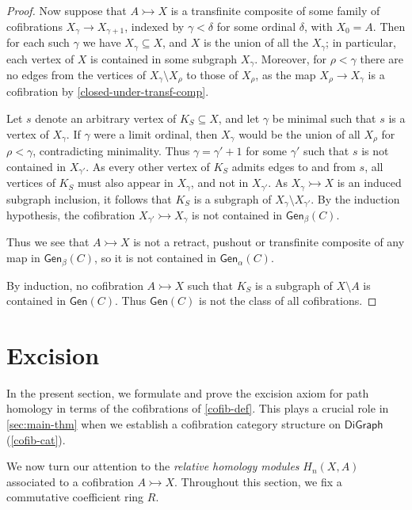 \documentclass[11pt]{article}
\theoremstyle{definition}
\numberwithin{equation}{section}
\newcommand{\DiGraph}{\mathsf{DiGraph}}
\newcommand{\Gen}{\mathsf{Gen}}
\newcommand{\cto}{\rightarrowtail}
\begin{document}
\begin{proof}
Now suppose that $A \cto X$ is a transfinite composite of some family of cofibrations $X_\gamma \to X_{\gamma + 1}$, indexed by $\gamma < \delta$ for some ordinal $\delta$, with $X_0 = A$. Then for each such $\gamma$ we have $X_\gamma \subseteq X$, and $X$ is the union of all the $X_\gamma$; in particular, each vertex of $X$ is contained in some subgraph $X_\gamma$. Moreover, for $\rho < \gamma$ there are no edges from the vertices of $X_\gamma \setminus X_\rho$ to those of $X_\rho$, as the map $X_\rho \to X_\gamma$ is a cofibration by \cref{closed-under-transf-comp}. 

Let $s$ denote an arbitrary vertex of $K_S \subseteq X$, and let $\gamma$ be minimal such that $s$ is a vertex of $X_\gamma$. If $\gamma$ were a limit ordinal, then $X_\gamma$ would be the union of all $X_\rho$ for $\rho < \gamma$, contradicting minimality. Thus $\gamma = \gamma' + 1$ for some $\gamma'$ such that $s$ is not contained in $X_{\gamma'}$. As every other vertex of $K_S$ admits edges to and from $s$, all vertices of $K_S$ must also appear in $X_\gamma$, and not in $X_{\gamma'}$. As $X_{\gamma} \cto X$ is an induced subgraph inclusion, it follows that $K_S$ is a subgraph of $X_\gamma \setminus X_{\gamma'}$. By the induction hypothesis, the cofibration $X_{\gamma'} \cto X_\gamma$ is not contained in $\Gen_{\beta}(C)$.

Thus we see that $A \cto X$ is not a retract, pushout or transfinite composite of any map in $\Gen_{\beta}(C)$, so it is not contained in $\Gen_{\alpha}(C)$.

By induction, no cofibration $A \cto X$ such that $K_S$ is a subgraph of $X \setminus A$ is contained in $\Gen(C)$. Thus $\Gen(C)$ is not the class of all cofibrations.
\end{proof}

\section{Excision} \label{sec:excision}

In the present section, we formulate and prove the excision axiom for path homology in terms of the cofibrations of \cref{cofib-def}.
This plays a crucial role in \cref{sec:main-thm} when we establish a cofibration category structure on $\DiGraph$ (\cref{cofib-cat}).

We now turn our attention to the \emph{relative homology modules} $H_n(X,A)$ associated to a cofibration $A \cto X$.
Throughout this section, we fix a commutative coefficient ring $R$.
\end{document}
